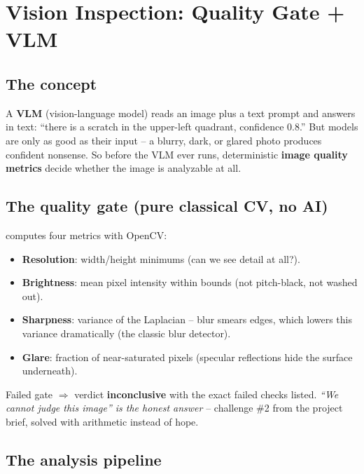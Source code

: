 \section{Vision Inspection: Quality Gate + VLM}

\subsection{The concept}
A \textbf{VLM} (vision-language model) reads an image plus a text prompt and answers
in text: ``there is a scratch in the upper-left quadrant, confidence 0.8.'' But models
are only as good as their input -- a blurry, dark, or glared photo produces confident
nonsense. So before the VLM ever runs, deterministic \textbf{image quality metrics}
decide whether the image is analyzable at all.

\subsection{The quality gate (pure classical CV, no AI)}
 computes four metrics with
OpenCV:
\begin{itemize}[nosep]
  \item \textbf{Resolution}: width/height minimums (can we see detail at all?).
  \item \textbf{Brightness}: mean pixel intensity within bounds (not pitch-black,
        not washed out).
  \item \textbf{Sharpness}: variance of the Laplacian -- blur smears edges, which
        lowers this variance dramatically (the classic blur detector).
  \item \textbf{Glare}: fraction of near-saturated pixels (specular reflections
        hide the surface underneath).
\end{itemize}
Failed gate $\Rightarrow$ verdict \textbf{inconclusive} with the exact failed checks
listed. \emph{``We cannot judge this image'' is the honest answer} -- challenge \#2 from
the project brief, solved with arithmetic instead of hope.


\subsection{The analysis pipeline}

